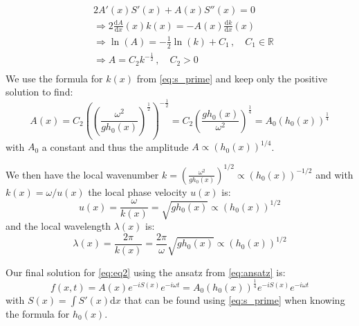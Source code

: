 \[
    \begin{aligned}
        & 2A'(x)S'(x) + A(x)S''(x) = 0 \\
        & \Rightarrow 2\frac{\mathrm{d}A}{\mathrm{d}x}(x)k(x) = - A(x) \frac{\mathrm{d}k}{\mathrm{d}x}(x) \\
        & \Rightarrow \ln(A) = -\frac{1}{2}\ln(k) + C_1\,, \quad C_1 \in \mathbb{R} \\
        & \Rightarrow A = C_2 k^{-\frac{1}{2}}\,, \quad C_2>0 \\
    \end{aligned}
\]
We use the formula for $k(x)$ from \autoref{eq:s_prime} and keep only the positive solution to find:
\begin{equation}
    A(x) = C_2 \left(\left(\frac{\omega^2}{gh_0(x)}\right)^{\frac{1}{2}}\right)^{-\frac{1}{2}} = C_2 \left(\frac{gh_0(x)}{\omega^2}\right)^\frac{1}{4} = A_0 (h_0(x))^\frac{1}{4}
\end{equation}
with $A_0$ a constant and thus the amplitude $A \propto (h_0(x))^{1/4}$.

We then have the local wavenumber $k = \left(\frac{\omega^2}{gh_0(x)}\right)^{1/2} \propto (h_0(x))^{-1/2}$ and with $k(x) = \omega / u(x)$ the local phase velocity $u(x)$ is:
\begin{equation}
    u(x) = \frac{\omega}{k(x)} = \sqrt{gh_0(x)} \propto (h_0(x))^{1/2}
\end{equation}
and the local wavelength $\lambda(x)$ is:
\begin{equation}
    \lambda(x) = \frac{2\pi}{k(x)} = \frac{2\pi}{\omega}\sqrt{gh_0(x)}  \propto (h_0(x))^{1/2}
\end{equation}

Our final solution for \autoref{eq:eq2} using the ansatz from \autoref{eq:ansatz} is:
\begin{equation}
    f(x,t) = A(x)e^{-iS(x)}e^{-i\omega t} = A_0 (h_0(x))^\frac{1}{4}e^{-iS(x)}e^{-i\omega t}
\end{equation}
with $S(x) = \int S'(x) \mathrm{d}x$ that can be found using \autoref{eq:s_prime} when knowing the formula for $h_0(x)$.


